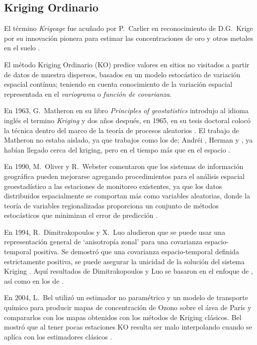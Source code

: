 \subsection{Kriging Ordinario}

El término {\em Krigeage} fue acuñado por P.\ Carlier en reconocimiento de D.G.\ Krige por su innovación pionera para estimar las concentraciones de oro y otros metales en el suelo \citep{oliver}.

El método Kriging Ordinario (KO) predice valores en sitios no visitados a partir de datos de muestra dispersos, basados en un modelo estocástico de variación espacial contínua; teniendo en cuenta conocimiento de la variación espacial representada en el \textit{variograma} o \textit{función de covarianza}. 

En 1963, G.\ Matheron en su libro \textit{Principles of geostatistics} introdujo al idioma inglés el termino \textit{Kriging} \citep{matheron1963} y dos años después, en 1965, en su tesis doctoral colocó la técnica dentro del marco de la teoría de procesos aleatorios \citep{matheron1965}. El trabajo de Matheron no estaba aislado, ya que trabajos como los de; Andréi \citet{kolmogorov1939,kolmogorov1941}, Herman \citet{wold} y \citet{wiener}, ya habían llegado cerca del kriging, pero en el tiempo más que en el espacio \citep{cressie1990}.

En 1990, M.\ Oliver y R.\ Webster comentaron que los sistemas de información geográfica pueden mejorarse agregando procedimientos para el análisis espacial geoestadístico a las estaciones de monitoreo existentes, ya que los datos distribuidos espacialmente se comportan más como variables aleatorias, donde la teoría de variables regionalizadas proporciona un conjunto de métodos estocásticos que minimizan el error de predicción \citep{oliver1984}.

En 1994, R.\ Dimitrakopoulos y X.\ Luo aludieron que se puede usar una representación general de `anisotropía zonal' para una covarianza espacio-temporal positiva. Se demostró que una covarianza espacio-temporal definida estrictamente positiva, se puede asegurar la unicidad de la solución del sistema Kriging \citep{dimitrakopoulos}. Aquí resultados de Dimitrakopoulos y Luo se basaron en el enfoque de \citet{buxton}, así como en los de \citet{bilonick2, bilonick1}.

En 2004, L.\ Bel utilizó un estimador no paramétrico y un modelo de transporte químico para producir mapas de concentración de Ozono sobre el área de París y compararlos con los mapas obtenidos con los métodos de Kriging clásicos. Bel mostró que al tener  pocas estaciones KO resulta ser malo interpolando cuando se aplíca con los estimadores clásicos \citep{bel}.

